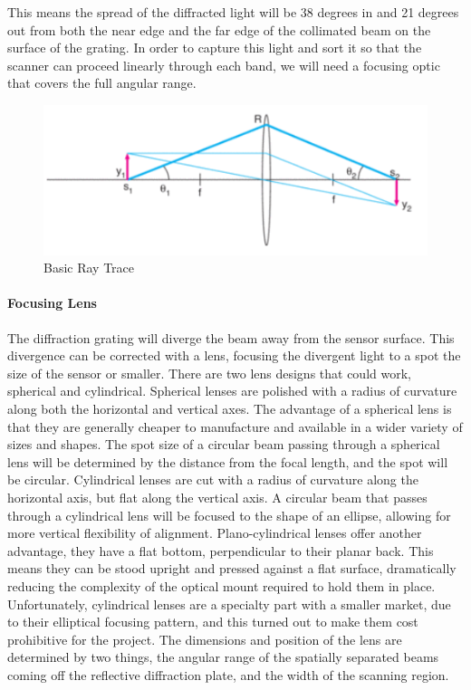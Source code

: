 \documentclass[journal]{IEEEtran}
\begin{document}
This means the spread of the diffracted light will be 38 degrees in and 21 degrees out from both the near edge and the far edge of the collimated beam on the surface of the grating. In order to capture this light and sort it so that the scanner can proceed linearly through each band, we will need a focusing optic that covers the full angular range.

\begin{figure}[H]
    \caption{Basic Ray Trace}
    \centering
    \includegraphics[width=0.75\linewidth]{images/BasicRayTrace.png}
\end{figure}

\paragraph{Focusing Lens} The diffraction grating will diverge the beam away from the sensor surface. This divergence can be corrected with a lens, focusing the divergent light to a spot the size of the sensor or smaller. There are two lens designs that could work, spherical and cylindrical. Spherical lenses are polished with a radius of curvature along both the horizontal and vertical axes. The advantage of a spherical lens is that they are generally cheaper to manufacture and available in a wider variety of sizes and shapes. The spot size of a circular beam passing through a spherical lens will be determined by the distance from the focal length, and the spot will be circular. Cylindrical lenses are cut with a radius of curvature along the horizontal axis, but flat along the vertical axis. A circular beam that passes through a cylindrical lens will be focused to the shape of an ellipse, allowing for more vertical flexibility of alignment. Plano-cylindrical lenses offer another advantage, they have a flat bottom, perpendicular to their planar back. This means they can be stood upright and pressed against a flat surface, dramatically reducing the complexity of the optical mount required to hold them in place. Unfortunately, cylindrical lenses are a specialty part with a smaller market, due to their elliptical focusing pattern, and this turned out to make them cost prohibitive for the project. The dimensions and position of the lens are determined by two things, the angular range of the spatially separated beams coming off the reflective diffraction plate, and the width of the scanning region. 
\end{document}
